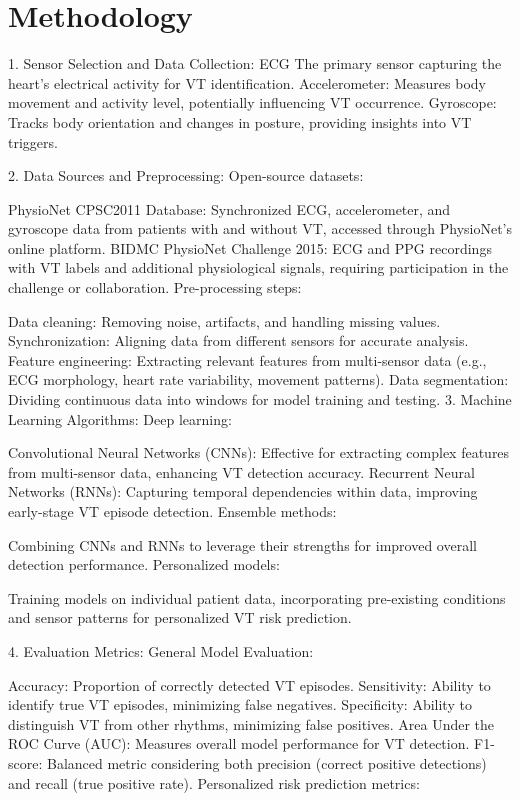 \section{Methodology}

1. Sensor Selection and Data Collection:
ECG The primary sensor capturing the heart's electrical activity for VT identification.
Accelerometer: Measures body movement and activity level, potentially influencing VT occurrence.
Gyroscope: Tracks body orientation and changes in posture, providing insights into VT triggers.

2. Data Sources and Preprocessing:
Open-source datasets:

PhysioNet CPSC2011 Database: Synchronized ECG, accelerometer, and gyroscope data from patients with and without VT, accessed through PhysioNet's online platform.
BIDMC PhysioNet Challenge 2015: ECG and PPG recordings with VT labels and additional physiological signals, requiring participation in the challenge or collaboration.
Pre-processing steps:

Data cleaning: Removing noise, artifacts, and handling missing values.
Synchronization: Aligning data from different sensors for accurate analysis.
Feature engineering: Extracting relevant features from multi-sensor data (e.g., ECG morphology, heart rate variability, movement patterns).
Data segmentation: Dividing continuous data into windows for model training and testing.
3. Machine Learning Algorithms:
Deep learning:

Convolutional Neural Networks (CNNs): Effective for extracting complex features from multi-sensor data, enhancing VT detection accuracy.
Recurrent Neural Networks (RNNs): Capturing temporal dependencies within data, improving early-stage VT episode detection.
Ensemble methods:

Combining CNNs and RNNs to leverage their strengths for improved overall detection performance.
Personalized models:

Training models on individual patient data,
incorporating pre-existing conditions and sensor patterns for personalized VT risk prediction.

4. Evaluation Metrics:
General Model Evaluation:

Accuracy: Proportion of correctly detected VT episodes.
Sensitivity: Ability to identify true VT episodes, minimizing false negatives.
Specificity: Ability to distinguish VT from other rhythms, minimizing false positives.
Area Under the ROC Curve (AUC): Measures overall model performance for VT detection.
F1-score: Balanced metric considering both precision (correct positive detections) and recall (true positive rate).
Personalized risk prediction metrics:

